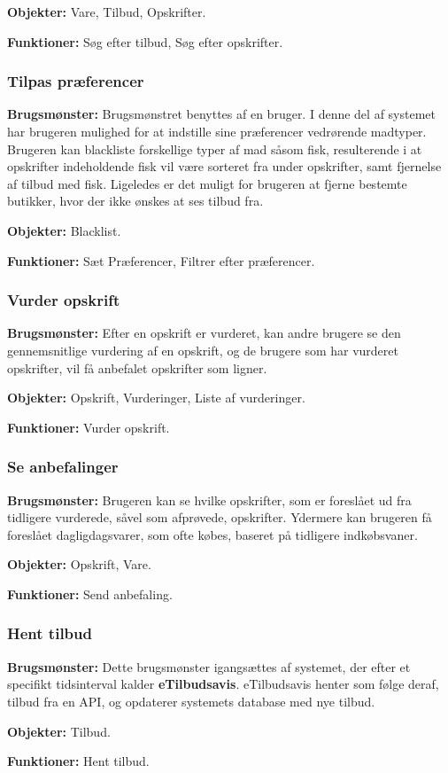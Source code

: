 \textbf{Objekter:} Vare, Tilbud, Opskrifter.

\textbf{Funktioner:} Søg efter tilbud, Søg efter opskrifter.

\subsubsection*{Tilpas præferencer}
\textbf{Brugsmønster:} Brugsmønstret benyttes af en bruger.
I denne del af systemet har brugeren mulighed for at indstille sine præferencer vedrørende madtyper.
Brugeren kan blackliste forskellige typer af mad såsom fisk, resulterende i at opskrifter indeholdende fisk vil være sorteret fra under opskrifter, samt fjernelse af tilbud med fisk. 
Ligeledes er det muligt for brugeren at fjerne bestemte butikker, hvor der ikke ønskes at ses tilbud fra.

\textbf{Objekter:} Blacklist.

\textbf{Funktioner:} Sæt Præferencer, Filtrer efter præferencer.

\subsubsection*{Vurder opskrift}
\textbf{Brugsmønster:} 
Efter en opskrift er vurderet, kan andre brugere se den gennemsnitlige vurdering af en opskrift, og de brugere som har vurderet opskrifter, vil få anbefalet opskrifter som ligner.

\textbf{Objekter:} Opskrift, Vurderinger, Liste af vurderinger.

\textbf{Funktioner:} Vurder opskrift.

\subsubsection*{Se anbefalinger}
\textbf{Brugsmønster:} Brugeren kan se hvilke opskrifter, som er foreslået ud fra tidligere vurderede, såvel som afprøvede, opskrifter.
Ydermere kan brugeren få foreslået dagligdagsvarer, som ofte købes, baseret på tidligere indkøbsvaner.

\textbf{Objekter:} Opskrift, Vare.

\textbf{Funktioner:} Send anbefaling.

\subsubsection*{Hent tilbud}
\textbf{Brugsmønster:} Dette brugsmønster igangsættes af systemet, der efter et specifikt tidsinterval kalder \textbf{eTilbudsavis}.
eTilbudsavis henter som følge deraf, tilbud fra en API, og opdaterer systemets database med nye tilbud.

\textbf{Objekter:} Tilbud.

\textbf{Funktioner:} Hent tilbud.